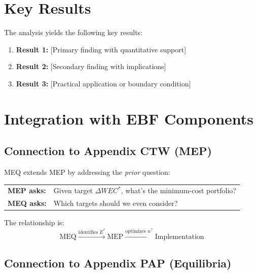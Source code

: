 \section{Key Results}
\label{sec:meq-results}

The analysis yields the following key results:

\begin{enumerate}
    \item \textbf{Result 1:} [Primary finding with quantitative support]
    \item \textbf{Result 2:} [Secondary finding with implications]
    \item \textbf{Result 3:} [Practical application or boundary condition]
\end{enumerate}


\section{Integration with EBF Components}
\label{sec:meq-integration}

\subsection{Connection to Appendix CTW (MEP)}

MEQ extends MEP by addressing the \textit{prior} question:

\begin{center}
\begin{tabular}{ll}
\textbf{MEP asks:} & Given target $\Delta WEC^*$, what's the minimum-cost portfolio? \\
\textbf{MEQ asks:} & Which targets should we even consider?
\end{tabular}
\end{center}

The relationship is:
\begin{equation}
\text{MEQ} \xrightarrow{\text{identifies } E^*} \text{MEP} \xrightarrow{\text{optimizes } w^*} \text{Implementation}
\end{equation}

\subsection{Connection to Appendix PAP (Equilibria)}

